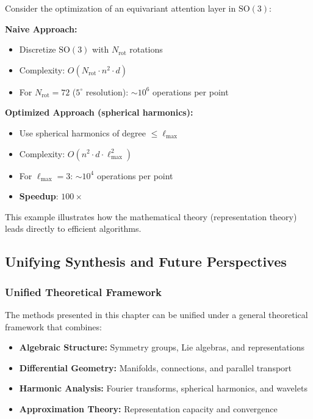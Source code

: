 Consider the optimization of an equivariant attention layer in $\text{SO}(3)$:

\textbf{Naive Approach:}
\begin{itemize}
\item Discretize $\text{SO}(3)$ with $N_{\text{rot}}$ rotations
\item Complexity: $O(N_{\text{rot}} \cdot n^2 \cdot d)$
\item For $N_{\text{rot}} = 72$ ($5^\circ$ resolution): $\sim 10^6$ operations per point
\end{itemize}

\textbf{Optimized Approach (spherical harmonics):}
\begin{itemize}
\item Use spherical harmonics of degree $\leq \ell_{\max}$
\item Complexity: $O(n^2 \cdot d \cdot \ell_{\max}^2)$
\item For $\ell_{\max} = 3$: $\sim 10^4$ operations per point
\item \textbf{Speedup}: $100\times$
\end{itemize}

This example illustrates how the mathematical theory (representation theory) leads directly to efficient algorithms.

\subsection{Unifying Synthesis and Future Perspectives}

\subsubsection{Unified Theoretical Framework}

The methods presented in this chapter can be unified under a general theoretical framework that combines:

\begin{itemize}
\item \textbf{Algebraic Structure:} Symmetry groups, Lie algebras, and representations
\item \textbf{Differential Geometry:} Manifolds, connections, and parallel transport
\item \textbf{Harmonic Analysis:} Fourier transforms, spherical harmonics, and wavelets
\item \textbf{Approximation Theory:} Representation capacity and convergence
\end{itemize}

